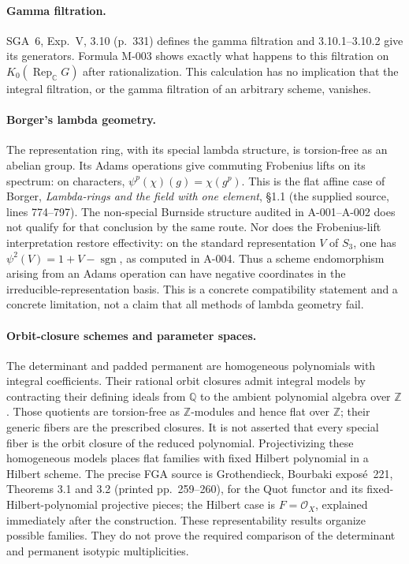 \paragraph{Gamma filtration.}
SGA~6, Exp.~V, 3.10 (p.~331) defines the gamma filtration and
3.10.1--3.10.2 give its generators.  Formula M-003 shows exactly
what happens to this filtration on \(K_0(\operatorname{Rep}_{\mathbb C}G)\)
after rationalization.  This calculation has no implication that
the integral filtration, or the gamma filtration of an arbitrary
scheme, vanishes.


\paragraph{Borger's lambda geometry.}
The representation ring, with its special lambda structure, is torsion-free
as an abelian group. Its Adams operations give commuting Frobenius lifts
on its spectrum: on characters, \(\psi^p(\chi)(g)=\chi(g^p)\).
This is the flat affine case of Borger, \emph{Lambda-rings and the field
with one element}, \S1.1 (the supplied source, lines 774--797).
The non-special Burnside structure audited in A-001--A-002 does not qualify for
that conclusion by the same route. Nor does the Frobenius-lift
interpretation restore effectivity: on the standard representation
\(V\) of \(S_3\), one has
\(\psi^2(V)=1+V-\operatorname{sgn}\), as computed in A-004.
Thus a scheme endomorphism arising from an Adams operation can have
negative coordinates in the irreducible-representation basis.
This is a concrete compatibility statement and a concrete limitation,
not a claim that all methods of lambda geometry fail.

\paragraph{Orbit-closure schemes and parameter spaces.}
The determinant and padded permanent are homogeneous polynomials
with integral coefficients.  Their rational orbit closures admit
integral models by contracting their defining ideals from
\(\mathbb Q\) to the ambient polynomial algebra over \(\mathbb Z\).
Those quotients are torsion-free as \(\mathbb Z\)-modules and hence
flat over \(\mathbb Z\); their generic fibers are the prescribed
closures.  It is not asserted that every special fiber is the
orbit closure of the reduced polynomial.
Projectivizing these homogeneous models places flat families with
fixed Hilbert polynomial in a Hilbert scheme.
The precise FGA source is Grothendieck, Bourbaki exposé~221,
Theorems 3.1 and 3.2 (printed pp.~259--260), for the Quot functor
and its fixed-Hilbert-polynomial projective pieces; the Hilbert
case is \(F=\mathcal O_X\), explained immediately after the
construction.  These representability results organize possible
families.  They do not prove the required comparison of the
determinant and permanent isotypic multiplicities.

